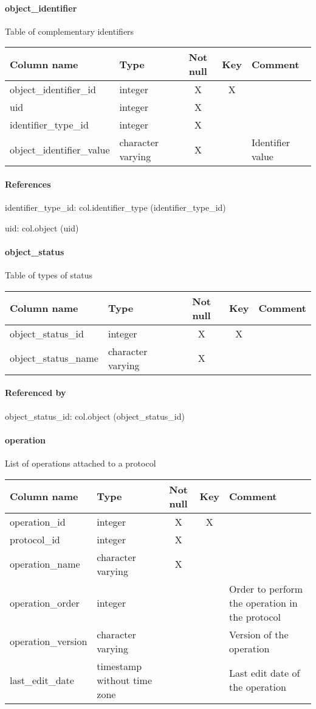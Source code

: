 \paragraph{object\_identifier}
Table of complementary identifiers

\begin{tabular}{|l| p{2cm}|c|c| p{5cm}|}
\hline
Column name & Type & Not null & Key & Comment \\
\hline
object\_identifier\_id & integer & X & X & \\
uid & integer & X &  & \\
identifier\_type\_id & integer & X &  & \\
object\_identifier\_value & character varying & X &  & Identifier value\\
\hline
\end{tabular}
\paragraph{References}
identifier\_type\_id: col.identifier\_type (identifier\_type\_id)

uid: col.object (uid)

\paragraph{object\_status}
Table of types of status

\begin{tabular}{|l| p{2cm}|c|c| p{5cm}|}
\hline
Column name & Type & Not null & Key & Comment \\
\hline
object\_status\_id & integer & X & X & \\
object\_status\_name & character varying & X &  & \\
\hline
\end{tabular}
\paragraph{Referenced by}
object\_status\_id: col.object (object\_status\_id)

\paragraph{operation}
List of operations attached to a protocol

\begin{tabular}{|l| p{2cm}|c|c| p{5cm}|}
\hline
Column name & Type & Not null & Key & Comment \\
\hline
operation\_id & integer & X & X & \\
protocol\_id & integer & X &  & \\
operation\_name & character varying & X &  & \\
operation\_order & integer &  &  & Order to perform the operation in the protocol\\
operation\_version & character varying &  &  & Version of the operation\\
last\_edit\_date & timestamp without time zone &  &  & Last edit date of the operation\\
\hline
\end{tabular}
